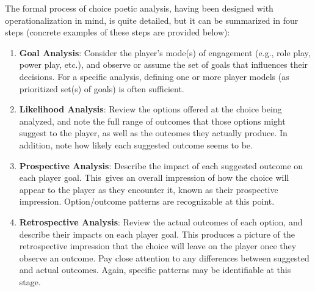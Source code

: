 \documentclass[arts,article,accept,moreauthors,pdftex,10pt,a4paper]{Definitions/mdpi}
\begin{document}
\label{sec:analysis_steps}
The formal process of choice poetic analysis, having been designed with operationalization in mind, is quite detailed, but it can be summarized in four steps (concrete examples of these steps are provided below):
\begin{enumerate}
  \item \textbf{Goal Analysis}: Consider the player's mode(s) of engagement (e.g., role play, power play, etc.), and observe or assume the set of goals that influences their decisions. For a specific analysis, defining one or more player models (as prioritized set(s) of goals) is often sufficient. %
  \item \textbf{Likelihood Analysis}: Review the options offered at the choice being analyzed, and note the full range of outcomes that those options might suggest to the player, as well as the outcomes they actually produce. In addition, note how likely each suggested outcome seems to be.
  \item \textbf{Prospective Analysis}: Describe the impact of each suggested outcome on each player goal. This~gives an overall impression of how the choice will appear to the player as they encounter it, known as their prospective impression. Option/outcome patterns are recognizable at this point.
  \item \textbf{Retrospective Analysis}: Review the actual outcomes of each option, and describe their impacts on each player goal. This produces a picture of the retrospective impression that the choice will leave on the player once they observe an outcome. Pay close attention to any differences between suggested and actual outcomes. Again, specific patterns may be identifiable at this stage.
\end{enumerate}
\end{document}

